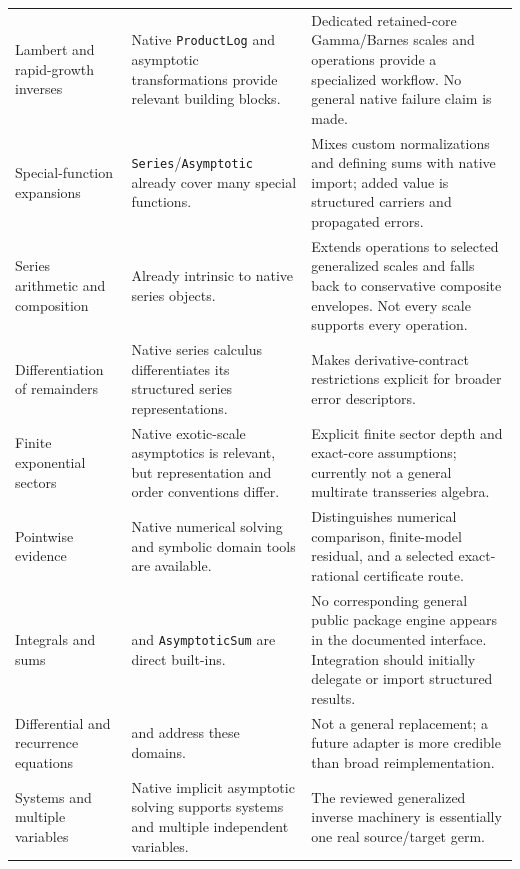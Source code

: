\begin{longtable}{@{}P{3.0cm}P{5.9cm}P{6.0cm}@{}}
Lambert and rapid-growth inverses & Native \texttt{ProductLog} and asymptotic transformations provide relevant building blocks. & Dedicated retained-core Gamma/Barnes scales and operations provide a specialized workflow. No general native failure claim is made.\cite{gammainverse,guide}\\
Special-function expansions & \texttt{Series}/\texttt{Asymptotic} already cover many special functions. & Mixes custom normalizations and defining sums with native import; added value is structured carriers and propagated errors.\cite{wl-series,wl-asymptotic,native,parameterized}\\
Series arithmetic and composition & Already intrinsic to native series objects. & Extends operations to selected generalized scales and falls back to conservative composite envelopes. Not every scale supports every operation.\cite{wl-seriesdata,operations,arithmetic}\\
Differentiation of remainders & Native series calculus differentiates its structured series representations. & Makes derivative-contract restrictions explicit for broader error descriptors.\cite{wl-seriesdata,operations}\\
Finite exponential sectors & Native exotic-scale asymptotics is relevant, but representation and order conventions differ. & Explicit finite sector depth and exact-core assumptions; currently not a general multirate transseries algebra.\cite{wl-asymptotic,flat}\\
Pointwise evidence & Native numerical solving and symbolic domain tools are available. & Distinguishes numerical comparison, finite-model residual, and a selected exact-rational certificate route.\cite{core,certificates,wl-functiondomain}\\
Integrals and sums &  and \texttt{AsymptoticSum} are direct built-ins. & No corresponding general public package engine appears in the documented interface. Integration should initially delegate or import structured results.\cite{wl-integrate,wl-sum,guide}\\
Differential and recurrence equations &  and  address these domains. & Not a general replacement; a future adapter is more credible than broad reimplementation.\cite{wl-dsolve,wl-rsolve,guide}\\
Systems and multiple variables & Native implicit asymptotic solving supports systems and multiple independent variables. & The reviewed generalized inverse machinery is essentially one real source/target germ.\cite{wl-asymptoticsolve,guide}\\
\bottomrule
\end{longtable}


